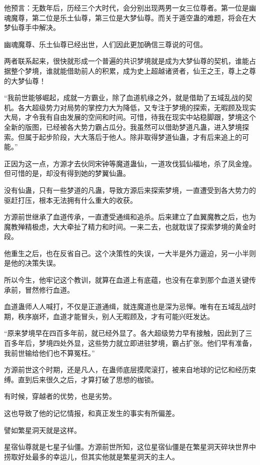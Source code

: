 \begin{this_body}
他预言：无数年后，历经三个大时代，会分别出现两男一女三位尊者。第一位是幽魂魔尊，第二位是乐土仙尊，第三位是大梦仙尊。而关于遁空蛊的难题，将会在大梦仙尊手中解决。

幽魂魔尊、乐土仙尊已经出世，人们因此更加确信三尊说的可信。

两者联系起来，很快就形成一个普遍的共识梦境就是成为大梦仙尊的契机，谁能占据整个梦境，谁就能借助前人的积累，成为史上超越诸贤者，仙王之王，尊上之尊的大梦仙尊！

“我前世能够崛起，成就一方霸业，除了血道机缘之外，就是借助了五域乱战的契机。各大超级势力对局势的掌控力大为降低，又专注于梦境的探索，无暇顾及现实大局，才令我有自由发展的空间和时间。可惜，待我在现实中站稳脚跟，梦境这个全新的版图，已经被各大势力霸占瓜分。我虽然可以借助梦道凡蛊，进入梦境探索。但属于起步阶段，大大落后于他人。除非取得梦道仙蛊，才有后来追上的可能。”

正因为这一点，方源才去伙同宋钟等魔道蛊仙，一道攻伐狐仙福地，杀了凤金煌。但可惜的是，却没有得到她的梦翼仙蛊。

没有仙蛊，只有一些梦道的凡蛊，导致方源后来探索梦境，一直遭受到各大势力的驱赶打压，根本无法拥有什么重大的收获。

方源前世继承了血道传承，一直遭受通缉和追杀。后来建立了血翼魔教之后，也为魔教殚精极虑，大大牵扯了精力和时间。一来二去，也就耽误了探索梦境的黄金时段。

他重生之后，也在反省自己。这个决策性的失误，一大半是外力逼迫，另一小半则是他的决策失误。

所以今生，他牢记这个教训，就算在血道上有底蕴，也没有在拿到那个血道关键传承前，冒然修行血道。

血道蛊师人人喊打，不仅是正道通缉，就连魔道也是深为忌惮。唯有在五域乱战时期，秩序崩坏，血道才能冒头，别人无暇顾及，才有可能兴旺发达。

“原来梦境早在四百多年前，就已经外显了。各大超级势力早有接触，因此到了三百多年后，梦境四处外显，这些势力就立即进驻梦境，霸占扩张。他们早有准备，我前世输给他们也不算冤枉。”

方源前世这个时期，还是凡人，在蛊师底层摸爬滚打，被来自地球的记忆和经历束缚。直到后来很久之后，才算打破了思想的枷锁。

有时候，穿越者的优势，也是劣势。

这也导致了他的记忆情报，和真正发生的事实有所偏差。

譬如繁星洞天就是这样。

星宿仙尊就是七星子仙僵。方源前世所知，这位星宿仙僵是在繁星洞天碎块世界中捞取好处最多的幸运儿，但其实他就是繁星洞天的主人。


\end{this_body}

